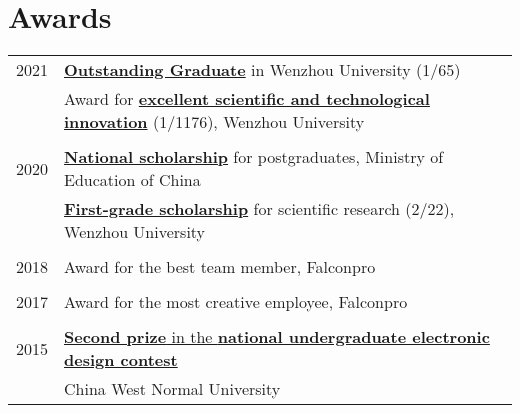 \documentclass[a4paper,10pt]{article} %
\begin{document}
\section{Awards}
\begin{tabular}{r|l}	
2021                        & \href{https://nbviewer.org/github/HuangJiaLian/DataBase0/blob/9d45d2d591813a771e408be12a8b8f3a1b06cd44/uPic/2021_11_26_10_1.pdf}{\textbf{Outstanding Graduate}} in Wenzhou University (1/65)\\
         				    & Award for \href{https://nbviewer.org/github/HuangJiaLian/DataBase0/blob/a069cea80af4ab070c9214480c666d4de1e5a054/uPic/2021_11_26_10_3.pdf}{\textbf{excellent scientific and technological innovation}} (1/1176), Wenzhou University\\
\multicolumn{2}{c}{} \\	%

2020                        & \href{https://nbviewer.org/github/HuangJiaLian/DataBase0/blob/84275fe6b9b504ce06b182972187707c372b4123/uPic/2021_11_26_10_N.pdf}{\textbf{National scholarship}} for postgraduates, Ministry of Education of China \\   	
                            & \href{https://nbviewer.org/github/HuangJiaLian/DataBase0/blob/ca47411a77d87d5af5ebc2c175a9b334642c6f48/uPic/2021_11_26_10_4.pdf}{\textbf{First-grade scholarship}} for scientific research (2/22), Wenzhou University \\
\multicolumn{2}{c}{} \\	%

2018                     & Award for the best team member, Falconpro\\
\multicolumn{2}{c}{} \\	%

2017                     & Award for the most creative employee, Falconpro \\
\multicolumn{2}{c}{} \\	%

2015                     & \href{https://nbviewer.org/github/HuangJiaLian/DataBase0/blob/bc9a8cc844b7cf3b1c44c40593df3afc35dd11b9/uPic/2021_11_26_10_electronic_design_contest.pdf}{\textbf{Second prize} in the \textbf{national undergraduate electronic design contest}} \\      & China West Normal University\\
\end{tabular}
	
\end{document}
